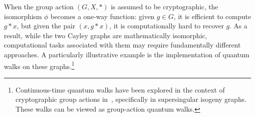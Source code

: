 \documentclass[12pt]{report}
\begin{document}
    When the group action \( (G, X, *) \) is assumed to be cryptographic, the isomorphism \( \phi \) becomes a one-way function: given \( g \in G \), it is efficient to compute \( g * x \), but given the pair \( (x, g * x) \), it is computationally hard to recover \( g \). As a result, while the two Cayley graphs are mathematically isomorphic, computational tasks associated with them may require fundamentally different approaches. A particularly illustrative example is the implementation of quantum walks on these graphs.\footnote{Continuous-time quantum walks have been explored in the context of cryptographic group actions in~\cite{booher2024failing, doliskani2023sample}, specifically in supersingular isogeny graphs. These walks can be viewed as group-action quantum walks.}






\end{document}
